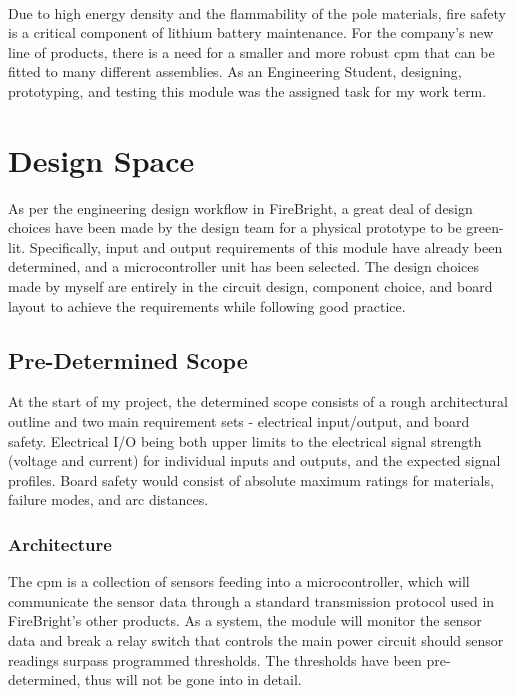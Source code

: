 \documentclass[12pt]{article}
\begin{document}
	\paragraph{}
	Due to high energy density and the flammability of the pole materials, fire safety is a critical component of lithium battery maintenance. For the company's new line of products, there is a need for a smaller and more robust \acrfull{cpm} that can be fitted to many different assemblies. As an Engineering Student, designing, prototyping, and testing this module was the assigned task for my work term.
	
	
	\section{Design Space}
	As per the engineering design workflow in FireBright, a great deal of design choices have been made by the design team for a physical prototype to be green-lit. Specifically, input and output requirements of this module have already been determined, and a microcontroller unit has been selected. The design choices made by myself are entirely in the circuit design, component choice, and board layout to achieve the requirements while following good practice.
	
	\subsection{Pre-Determined Scope}
	At the start of my project, the determined scope consists of a rough architectural outline and two main requirement sets - electrical input/output, and board safety. Electrical I/O being both upper limits to the electrical signal strength (voltage and current) for individual inputs and outputs, and the expected signal profiles. Board safety would consist of absolute maximum ratings for materials, failure modes, and arc distances.
	
    \subsubsection{Architecture}
    The \acrshort{cpm} is a collection of sensors feeding into a microcontroller, which will communicate the sensor data through a standard transmission protocol used in FireBright's other products. As a system, the module will monitor the sensor data and break a relay switch that controls the main power circuit should sensor readings surpass programmed thresholds. The thresholds have been pre-determined, thus will not be gone into in detail.
\end{document}
